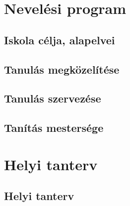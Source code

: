 \part{Nevelési program}
\chapter{Iskola célja, alapelvei}
\label{sec:alapelvek}


\chapter{Tanulás megközelítése}


\chapter{Tanulás szervezése}


\chapter{Tanítás mestersége}


\part{Helyi tanterv}
\chapter{Helyi tanterv}
\label{az-iskola-helyi-tanterve}


